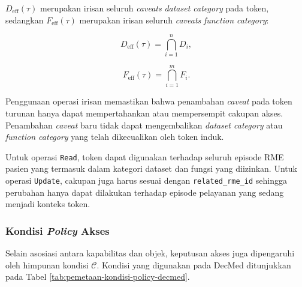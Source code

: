 $D_{\operatorname{eff}}(\tau)$ merupakan irisan seluruh \textit{caveats} \textit{dataset category} pada token, sedangkan $F_{\operatorname{eff}}(\tau)$ merupakan irisan seluruh \textit{caveats} \textit{function category}:

\begin{equation}
	D_{\operatorname{eff}}(\tau)
	=
	\bigcap_{i=1}^{n} D_i,
\end{equation}

\begin{equation}
	F_{\operatorname{eff}}(\tau)
	=
	\bigcap_{i=1}^{m} F_i.
\end{equation}

Penggunaan operasi irisan memastikan bahwa penambahan \textit{caveat} pada token turunan hanya dapat mempertahankan atau mempersempit cakupan akses. Penambahan \textit{caveat} baru tidak dapat mengembalikan \textit{dataset category} atau \textit{function category} yang telah dikecualikan oleh token induk.

Untuk operasi \texttt{Read}, token dapat digunakan terhadap seluruh episode RME pasien yang termasuk dalam kategori dataset dan fungsi yang diizinkan. Untuk operasi \texttt{Update}, cakupan juga harus sesuai dengan \texttt{related\_rme\_id} sehingga perubahan hanya dapat dilakukan terhadap episode pelayanan yang sedang menjadi konteks token.

\subsubsection{Kondisi \textit{Policy} Akses}

Selain asosiasi antara kapabilitas dan objek, keputusan akses juga dipengaruhi oleh himpunan kondisi $\mathcal{C}$. Kondisi yang digunakan pada DecMed ditunjukkan pada Tabel \ref{tab:pemetaan-kondisi-policy-decmed}.

